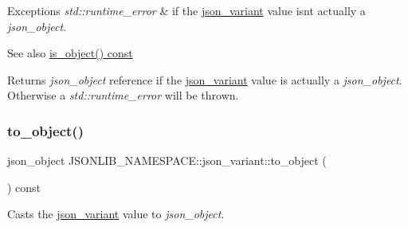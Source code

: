 \begin{DoxyExceptions}{Exceptions}
{\em std\+::runtime\+\_\+error} & if the \hyperlink{classJSONLIB__NAMESPACE_1_1json__variant}{json\+\_\+variant} value isn\textquotesingle{}t actually a {\itshape json\+\_\+object}. \\
\hline
\end{DoxyExceptions}
\begin{DoxySeeAlso}{See also}
\hyperlink{classJSONLIB__NAMESPACE_1_1json__variant_a28b4156626bd9f0e344ba1704c7590f3}{is\+\_\+object() const} 
\end{DoxySeeAlso}
\begin{DoxyReturn}{Returns}
{\itshape json\+\_\+object} reference if the \hyperlink{classJSONLIB__NAMESPACE_1_1json__variant}{json\+\_\+variant} value is actually a {\itshape json\+\_\+object}. Otherwise a {\itshape std\+::runtime\+\_\+error} will be thrown. 
\end{DoxyReturn}
\mbox{\label{classJSONLIB__NAMESPACE_1_1json__variant_a28035668bca7e7829340fe994581564d}} 
\subsubsection{\texorpdfstring{to\+\_\+object()}{to\_object()}\hspace{0.1cm}{\footnotesize\ttfamily [3/4]}}
{\footnotesize\ttfamily json\+\_\+object J\+S\+O\+N\+L\+I\+B\+\_\+\+N\+A\+M\+E\+S\+P\+A\+C\+E\+::json\+\_\+variant\+::to\+\_\+object (\begin{DoxyParamCaption}{ }\end{DoxyParamCaption}) const}



Casts the \hyperlink{classJSONLIB__NAMESPACE_1_1json__variant}{json\+\_\+variant} value to {\itshape json\+\_\+object}. 


